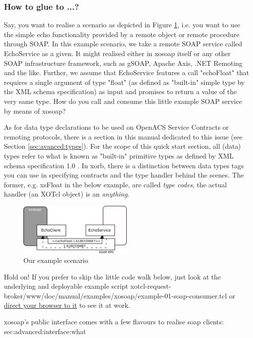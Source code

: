   \subsubsection{How to glue to ...?}\label{sec:xosoap:quickstart:glueto}
  Say, you want to realise a scenario as depicted in Figure \ref{fig:quickstart:xosoap:1}, i.e. you want to 
use the simple echo functionality provided by a remote object or remote procedure through SOAP. In this 
example scenario, we take a remote SOAP service called EchoService as a given. It might realised 
either in xosoap itself or any other SOAP infrastructure framework, such as gSOAP, Apache Axis, .NET 
Remoting and the like. Further, we assume that  EchoService features a call "echoFloat" that requires a 
single argument of type "float" (as defined as "built-in" simple type by the XML schema specification) as 
input and promises to return a value of the very same type. How do you call and consume this little 
example SOAP service by means of xosoap?
\begin{hints}
\item As for data type declarations to be used on OpenACS Service Contracts or remoting protocols, there is a section in this manual dedicated to this issue (see Section \ref{sec:avanced:types}). For the scope of this quick start section, all (data) types refer to what is known as "built-in" primitive types as defined by  XML schema specification 1.0 \cite{w3c:2004}. In xorb, there is a distinction between data types tags you can use in specifying contracts and the type handler behind the scenes. The former, e.g. xsFloat in the below example, are called \emph{type codes}, the actual handler  (an XOTcl object) is an \emph{anything}.
\end{hints}
\begin{figure}[htbp]
\begin{center}
\includegraphics[width=0.5\textwidth]{img/consumer.png}
\caption{Our example scenario}
\label{fig:quickstart:xosoap:1}
\end{center}
\end{figure}
\begin{hints}
\item Hold on! If you prefer to skip the little code walk below, just look at the underlying and deployable 
example script xotcl-request-broker/www/doc/manual/examples/xosoap/example-01-soap-consumer.tcl 
or \href{http://openacs-dotlrn.wu-wien.ac.at/request-broker/doc/manual/examples/xosoap/example-01-
soap-consumer.tcl}{direct your browser to it} to see it at work.
\item xosoap's public interface comes with a few flavours to realise soap clients: \nameref
{sec:advanced:interface:what}
\end{hints}

